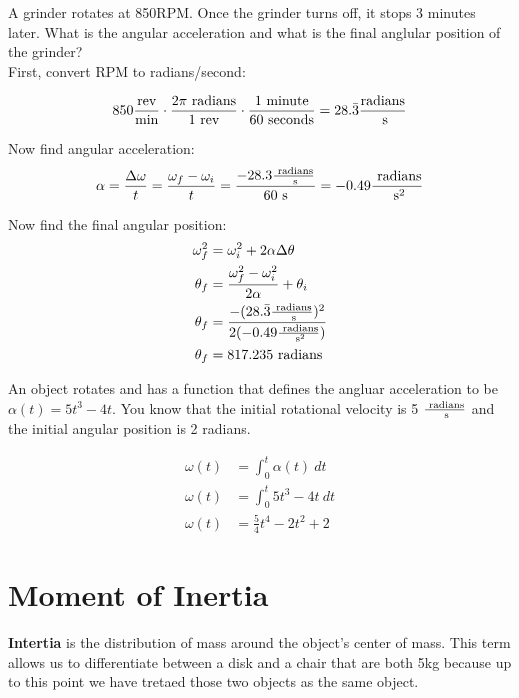 \begin{problem}
    A grinder rotates at 850RPM. Once the grinder turns off, it stops 3 minutes later. What is the angular acceleration and what is the final anglular position of the grinder?\\

    First, convert RPM to radians/second:

    \[
    850 \frac{\text{rev}}{\text{min}}\cdot\frac{2\pi \text{ radians}}{1 \text{ rev}}\cdot\frac{1 \text{ minute}}{60 \text{ seconds}} = 28.\bar{3} \frac{\text{radians}}{\text{ s}}   
    \]

    Now find angular acceleration:
    \[
    \alpha = \frac{\Delta \omega}{t} = \frac{\omega_f - \omega_i}{t} = \frac{- 28.3 \frac{\text{ radians}}{\text{ s}}}{60 \text{ s}} = -0.49 \frac{\text{ radians}}{\text{ s}^2}   
    \]

    Now find the final angular position:
    \[
    \begin{aligned}
        \omega_f^2 &= \omega_i^2 + 2\alpha\Delta\theta\\
        \theta_f &= \frac{\omega_f^2 - \omega_i^2}{2\alpha} + \theta_i\\
        \theta_f &= \frac{-(28.\bar{3} \frac{\text{ radians}}{\text{ s}})^2}{2(-0.49 \frac{\text{ radians}}{\text{ s}^2})}\\
        \theta_f &= 817.235 \text{ radians}
    \end{aligned}    
    \]
\end{problem}


\begin{problem}
    An object rotates and has a function that defines the angluar acceleration to be $\alpha(t) = 5t^3 - 4t$. You know that the initial rotational velocity is 5 $\frac{\text{ radians}}{\text{ s}}$ and the initial angular position is 2 radians. 

    \[
    \begin{aligned}
        \omega(t) &= \int_0^t \alpha(t)\:dt\\
        \omega(t) &= \int_0^t 5t^3 - 4t \: dt\\
        \omega(t) &= \frac{5}{4}t^4 - 2t^2 + 2
    \end{aligned}    
    \]
\end{problem}


\section{Moment of Inertia}

\textbf{Intertia} is the distribution of mass around the object's center of mass. This term allows us to differentiate between a disk and a chair that are both 5kg because up to this point we have tretaed those two objects as the same object. 


